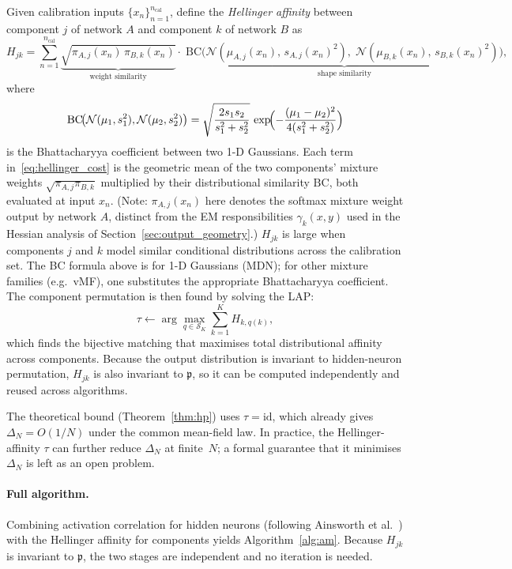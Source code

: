 \documentclass[11pt]{article}
\newcommand{\cS}{\mathcal{S}}
\newcommand{\cN}{\mathcal{N}}
\newcommand{\nperm}{\mathfrak{p}}  %
\begin{document}
Given calibration inputs $\{x_n\}_{n=1}^{n_{\mathrm{cal}}}$, define the
\emph{Hellinger affinity} between component $j$ of network $A$ and
component $k$ of network $B$ as
\begin{equation}\label{eq:hellinger_cost}
  H_{jk} = \sum_{n=1}^{n_{\mathrm{cal}}}
    \underbrace{\sqrt{\pi_{A,j}(x_n)\,\pi_{B,k}(x_n)}}_{\text{weight similarity}}
    \cdot\;
    \underbrace{\mathrm{BC}\!\bigl(
      \cN(\mu_{A,j}(x_n),\,s_{A,j}(x_n)^2),\;
      \cN(\mu_{B,k}(x_n),\,s_{B,k}(x_n)^2)
    \bigr)}_{\text{shape similarity}},
\end{equation}
where
\[
  \mathrm{BC}\!\bigl(\cN(\mu_1,s_1^2),\cN(\mu_2,s_2^2)\bigr)
  = \sqrt{\frac{2s_1 s_2}{s_1^2+s_2^2}}\,
    \exp\!\Bigl(-\frac{(\mu_1-\mu_2)^2}{4(s_1^2+s_2^2)}\Bigr)
\]
is the Bhattacharyya coefficient between two 1-D Gaussians.
Each term in~\eqref{eq:hellinger_cost} is the geometric mean of the
two components' mixture weights $\sqrt{\pi_{A,j}\pi_{B,k}}$ multiplied
by their distributional similarity $\mathrm{BC}$, both evaluated at
input $x_n$.
(Note: $\pi_{A,j}(x_n)$ here denotes the softmax mixture weight output
by network $A$, distinct from the EM responsibilities
$\gamma_k(x,y)$ used in the Hessian analysis of Section~\ref{sec:output_geometry}.)
$H_{jk}$ is large when components $j$ and $k$ model similar
conditional distributions across the calibration set.
The BC formula above is for 1-D Gaussians (MDN); for other
mixture families (e.g.\ vMF), one substitutes the appropriate
Bhattacharyya coefficient.
The component permutation is then found by solving the LAP:
\[
  \tau \leftarrow \arg\max_{q \in \cS_K}\sum_{k=1}^K H_{k,q(k)},
\]
which finds the bijective matching that maximises total distributional
affinity across components.
Because the output distribution is invariant to hidden-neuron
permutation, $H_{jk}$ is also invariant to $\nperm$, so it can be
computed independently and reused across algorithms.

The theoretical bound (Theorem~\ref{thm:hp}) uses $\tau = \mathrm{id}$,
which already gives $\Delta_N = O(1/N)$ under the common mean-field
law.
In practice, the Hellinger-affinity $\tau$ can further reduce
$\Delta_N$ at finite~$N$; a formal guarantee that it minimises
$\Delta_N$ is left as an open problem.

\paragraph{Full algorithm.}
Combining activation correlation for hidden neurons
(following Ainsworth et al.~\cite{ainsworth2023}) with the Hellinger
affinity for components yields Algorithm~\ref{alg:am}.
Because $H_{jk}$ is invariant to $\nperm$, the two stages are
independent and no iteration is needed.
\end{document}
